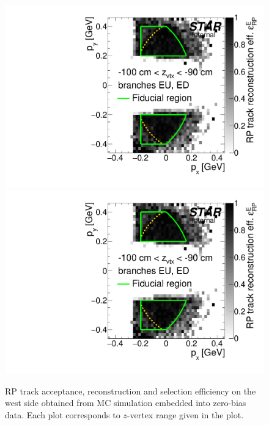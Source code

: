 \begin{figure}[hb]
\caption[RP track acceptance, reconstruction and selection efficiency on the west (MC embedded into zero-bias data).]{RP track acceptance, reconstruction and selection efficiency on the west side obtained from MC simulation embedded into zero-bias data. Each plot corresponds to $z$-vertex range given in the plot.}\label{fig:rpEffW}
\centering
\parbox{0.495\textwidth}{
  \centering
  \includegraphics[width=\linewidth,page=23]{graphics/corrections/mcFullEffPxPy.pdf}\\
  \includegraphics[width=\linewidth,page=25]{graphics/corrections/mcFullEffPxPy.pdf}\\
}
\end{figure}
